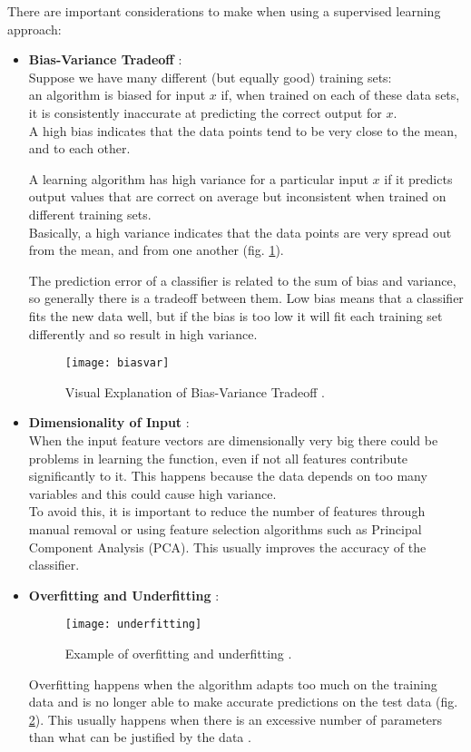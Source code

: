 There are important considerations to make when using a supervised learning approach:
\begin{itemize}
	\item \textbf{Bias-Variance Tradeoff} \cite{biasvar}: \\	
	Suppose we have many different (but equally good) training sets: \\
	an algorithm is biased for input $x$ if, when trained on each of these data sets, it is consistently inaccurate at predicting the correct output for $x$. \\
	A high bias indicates that the data points tend to be very close to the mean, and to each other.
	
	A learning algorithm has high variance for a particular input $x$ if it predicts output values that are correct on average but inconsistent when trained on different training sets. \\
	Basically, a high variance indicates that the data points are very spread out from the mean, and from one another (fig. \ref{fig:biasvar}).
	
	The prediction error of a classifier is related to the sum of bias and variance, so generally there is a tradeoff between them. Low bias means that a classifier fits the new data well, but if the bias is too low it will fit each training set differently and so result in high variance.
	
	\clearpage
	
	\begin{figure}[H]
		\centering
		\texttt{[image: biasvar]}
		\caption{Visual Explanation of Bias-Variance Tradeoff \cite{biasvarTradeoff}.}
		\label{fig:biasvar}
	\end{figure}	

	\item \textbf{Dimensionality of Input} \cite{wiki:dim_red}:\\ 
	When the input feature vectors are dimensionally very big there could be problems in learning the function, even if not all features contribute significantly to it. This happens because the data depends on too many variables and this could cause high variance. \\
	To avoid this, it is important to reduce the number of features through manual removal or using feature selection algorithms such as Principal Component Analysis (PCA). This usually improves the accuracy of the classifier.
	\item \textbf{Overfitting and Underfitting} \cite{overfit}:
	\begin{figure}[H]
		\centering
		\texttt{[image: underfitting]}
		\caption{Example of overfitting and underfitting \cite{underfitting}.}
		\label{fig:underfitting}
	\end{figure}
	Overfitting happens when the algorithm adapts too much on the training data and is no longer able to make accurate predictions on the test data (fig. \ref{fig:underfitting}). This usually happens when there is an excessive number of parameters than what can be justified by the data \cite{camb_over}.
	

\end{itemize}
